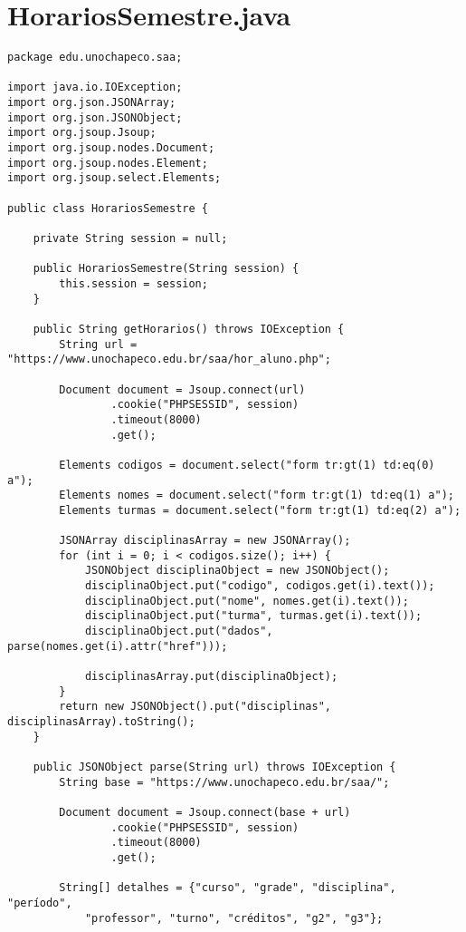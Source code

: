 \section{HorariosSemestre.java}

\begin{lstlisting}
package edu.unochapeco.saa;

import java.io.IOException;
import org.json.JSONArray;
import org.json.JSONObject;
import org.jsoup.Jsoup;
import org.jsoup.nodes.Document;
import org.jsoup.nodes.Element;
import org.jsoup.select.Elements;

public class HorariosSemestre {

    private String session = null;

    public HorariosSemestre(String session) {
        this.session = session;
    }

    public String getHorarios() throws IOException {
        String url = "https://www.unochapeco.edu.br/saa/hor_aluno.php";

        Document document = Jsoup.connect(url)
                .cookie("PHPSESSID", session)
                .timeout(8000)
                .get();

        Elements codigos = document.select("form tr:gt(1) td:eq(0) a");
        Elements nomes = document.select("form tr:gt(1) td:eq(1) a");
        Elements turmas = document.select("form tr:gt(1) td:eq(2) a");

        JSONArray disciplinasArray = new JSONArray();
        for (int i = 0; i < codigos.size(); i++) {
            JSONObject disciplinaObject = new JSONObject();
            disciplinaObject.put("codigo", codigos.get(i).text());
            disciplinaObject.put("nome", nomes.get(i).text());
            disciplinaObject.put("turma", turmas.get(i).text());
            disciplinaObject.put("dados", parse(nomes.get(i).attr("href")));

            disciplinasArray.put(disciplinaObject);
        }
        return new JSONObject().put("disciplinas", disciplinasArray).toString();
    }

    public JSONObject parse(String url) throws IOException {
        String base = "https://www.unochapeco.edu.br/saa/";

        Document document = Jsoup.connect(base + url)
                .cookie("PHPSESSID", session)
                .timeout(8000)
                .get();

        String[] detalhes = {"curso", "grade", "disciplina", "período",
            "professor", "turno", "créditos", "g2", "g3"};


\end{lstlisting}
